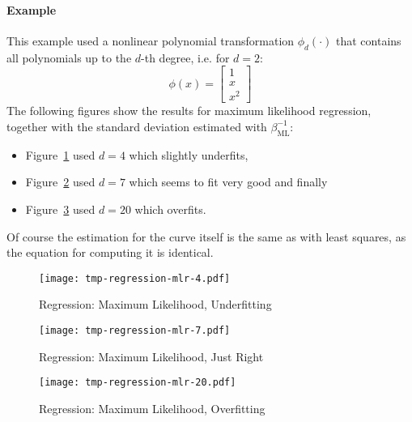 \documentclass[a4paper, 11pt, accentcolor = tud3b]{tudreport}
\begin{document}
				\paragraph{Example}
					This example used a nonlinear polynomial transformation \( \phi_d(\cdot) \) that contains all polynomials up to the \(d\)-th degree, i.e. for \( d = 2 \):
					\begin{equation}
						\phi(x) =
							\begin{bmatrix}
								1 \\
								x \\
								x^2
							\end{bmatrix}
					\end{equation}
					The following figures show the results for maximum likelihood regression, together with the standard deviation estimated with \( \beta_\textrm{ML}^{-1} \):
					\begin{itemize}
						\item Figure~\ref{fig:regressionMlUnderfit} used \( d = 4 \) which slightly underfits,
						\item Figure~\ref{fig:regressionMlRight} used \( d = 7 \) which seems to fit very good and finally
						\item Figure~\ref{fig:regressionMlOverfit} used \( d = 20 \) which overfits.
					\end{itemize}
					Of course the estimation for the curve itself is the same as with least squares, as the equation for computing it is identical.
					
					\begin{figure}
						\centering
						\texttt{[image: tmp-regression-mlr-4.pdf]}
						\caption{Regression: Maximum Likelihood, Underfitting}
						\label{fig:regressionMlUnderfit}
					\end{figure}
					\begin{figure}
						\centering
						\texttt{[image: tmp-regression-mlr-7.pdf]}
						\caption{Regression: Maximum Likelihood, Just Right}
						\label{fig:regressionMlRight}
					\end{figure}
					\begin{figure}
						\centering
						\texttt{[image: tmp-regression-mlr-20.pdf]}
						\caption{Regression: Maximum Likelihood, Overfitting}
						\label{fig:regressionMlOverfit}
					\end{figure}
\end{document}
